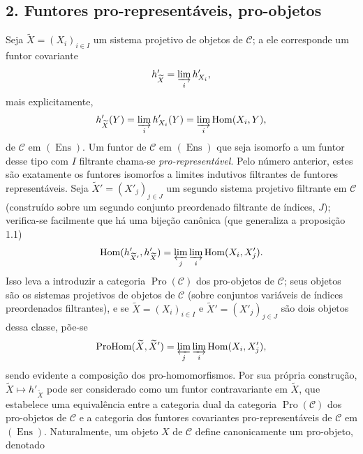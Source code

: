 \documentclass[11pt,twoside,openany]{book}
\numberwithin{equation}{section}
\theoremstyle{plain}
\theoremstyle{definition}
\theoremstyle{remark}
\begin{document}
\subsection*{2. Funtores pro-representáveis, pro-objetos}

Seja $\widetilde X=(X_i)_{i\in I}$ um sistema projetivo de objetos de
$\mathcal C$; a ele corresponde um funtor covariante
\[
  h'_{\widetilde X}=\varinjlim_i h'_{X_i},
\]
mais explicitamente,
\[
  h'_{\widetilde X}(Y)=\varinjlim_i h'_{X_i}(Y)
  =\varinjlim_i\operatorname{Hom}(X_i,Y),
\]
de $\mathcal C$ em $(\operatorname{Ens})$. Um funtor de $\mathcal C$ em
$(\operatorname{Ens})$ que seja isomorfo a um funtor desse tipo com $I$
filtrante chama-se \emph{pro-representável}. Pelo número anterior, estes são
exatamente os funtores isomorfos a limites indutivos filtrantes de funtores
representáveis. Seja $\widetilde X'=(X'_j)_{j\in J}$ um segundo sistema
projetivo filtrante em $\mathcal C$ (construído sobre um segundo conjunto
preordenado filtrante de índices, $J$); verifica-se facilmente que há uma
bijeção canônica (que generaliza a proposição 1.1)
\[
  \operatorname{Hom}(h'_{\widetilde X'},h'_{\widetilde X})
  =\varprojlim_j\varinjlim_i\operatorname{Hom}(X_i,X'_j).
\]
Isso leva a introduzir a categoria $\operatorname{Pro}(\mathcal C)$ dos
pro-objetos de $\mathcal C$; seus objetos são os sistemas projetivos de objetos
de $\mathcal C$ (sobre conjuntos variáveis de índices preordenados filtrantes),
e se $\widetilde X=(X_i)_{i\in I}$ e
$\widetilde X'=(X'_j)_{j\in J}$ são dois objetos dessa classe, põe-se
\[
  \operatorname{ProHom}(\widetilde X,\widetilde X')
  =\varprojlim_j\varinjlim_i\operatorname{Hom}(X_i,X'_j),
\]
sendo evidente a composição dos pro-homomorfismos. Por sua própria
construção, $\widetilde X\longmapsto h'_{\widetilde X}$ pode ser considerado
como um funtor contravariante em $\widetilde X$, que estabelece uma equivalência
entre a categoria dual da categoria $\operatorname{Pro}(\mathcal C)$ dos
pro-objetos de $\mathcal C$ e a categoria dos funtores covariantes
pro-representáveis de $\mathcal C$ em $(\operatorname{Ens})$. Naturalmente, um
objeto $X$ de $\mathcal C$ define canonicamente um pro-objeto, denotado
\end{document}

